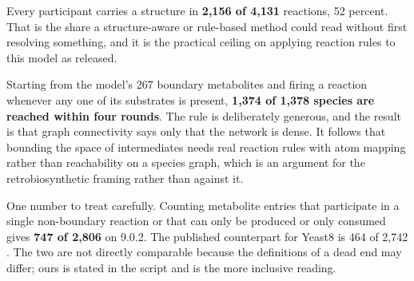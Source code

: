 Every participant carries a structure in \textbf{2{,}156 of 4{,}131} reactions, 52 percent.
That is the share a structure-aware or rule-based method could read without first resolving
something, and it is the practical ceiling on applying reaction rules to this model as
released.

Starting from the model's 267 boundary metabolites and firing a reaction whenever any one of
its substrates is present, \textbf{1{,}374 of 1{,}378 species are reached within four rounds}.
The rule is deliberately generous, and the result is that graph connectivity says only that
the network is dense. It follows that bounding the space of intermediates needs real reaction
rules with atom mapping rather than reachability on a species graph, which is an argument for
the retrobiosynthetic framing rather than against it.

One number to treat carefully. Counting metabolite entries that participate in a single
non-boundary reaction or that can only be produced or only consumed gives \textbf{747 of
2{,}806} on 9.0.2. The published counterpart for Yeast8 is 464 of 2{,}742 . The two are not directly comparable because the definitions of a dead end may
differ; ours is stated in the script and is the more inclusive reading.
